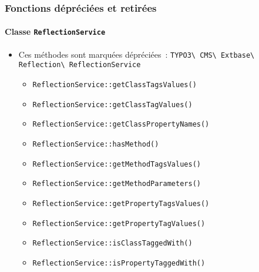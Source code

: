 
\begin{frame}[fragile]
	\frametitle{Fonctions dépréciées et retirées}
	\framesubtitle{Classe \texttt{ReflectionService}}

	\begin{itemize}
		\item Ces méthodes sont marquées dépréciées~:\newline
			\smaller\texttt{TYPO3\textbackslash
				CMS\textbackslash
				Extbase\textbackslash
				Reflection\textbackslash
				ReflectionService}\normalsize

				\begin{itemize}\smaller
					\item \texttt{ReflectionService::getClassTagsValues()}
					\item \texttt{ReflectionService::getClassTagValues()}
					\item \texttt{ReflectionService::getClassPropertyNames()}
					\item \texttt{ReflectionService::hasMethod()}
					\item \texttt{ReflectionService::getMethodTagsValues()}
					\item \texttt{ReflectionService::getMethodParameters()}
					\item \texttt{ReflectionService::getPropertyTagsValues()}
					\item \texttt{ReflectionService::getPropertyTagValues()}
					\item \texttt{ReflectionService::isClassTaggedWith()}
					\item \texttt{ReflectionService::isPropertyTaggedWith()}
				\end{itemize}

	\end{itemize}

\end{frame}


